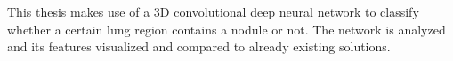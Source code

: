 \documentclass[main.tex]{subfiles}
\begin{document}
This thesis makes use of a 3D convolutional deep neural network to classify whether a certain lung region contains a nodule or not. The network is analyzed and its features visualized and compared to already existing solutions.
\end{document}
